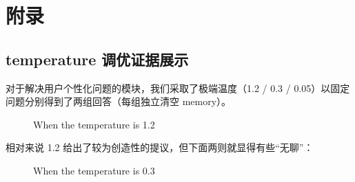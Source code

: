 \documentclass{article}
\theoremstyle{plain}
\theoremstyle{definition}
\theoremstyle{remark}
\begin{document}




\newpage
\appendix
\onecolumn
\section{附录}


\subsection{temperature 调优证据展示}

对于解决用户个性化问题的模块，我们采取了极端温度（1.2 / 0.3 / 0.05）以固定问题分别得到了两组回答（每组独立清空 memory）。

\begin{figure}[H]
\centering
{}
\caption{When the temperature is 1.2}
\label{Fig.main}
\end{figure}

相对来说 1.2 给出了较为创造性的提议，但下面两则就显得有些“无聊”：

\begin{figure}[H]
\centering
{}
\caption{When the temperature is 0.3}
\label{Fig.main}
\end{figure}
\end{document}
